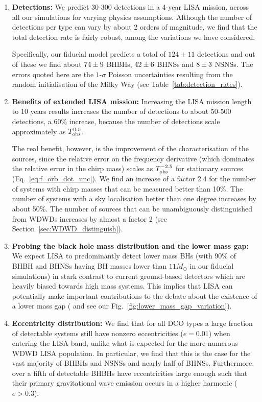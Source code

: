 \begin{enumerate}
    \item \textbf{Detections:} We predict 30-300 detections in a 4-year LISA mission, across all our simulations for varying physics assumptions. Although the number of detections per type can vary by about 2 orders of magnitude, we find that the total detection rate is fairly robust, among the variations we have considered.
    
    Specifically, our fiducial model predicts a total of $124 \pm 11$ detections and out of these we find about $74{}\pm 9$ BHBHs, $42{}\pm 6$ BHNSs and $8{}\pm 3$ NSNSs. The errors quoted here are the $1$-$\sigma$ Poisson uncertainties resulting from the random initialisation of the Milky Way (see Table~\ref{tab:detection_rates}).
    
    \item \textbf{Benefits of extended LISA mission:} Increasing the LISA mission length to 10 years results increases the number of detections to about 50-500 detections, a 60\% increase, because the number of detections scale approximately as $T_{\rm obs}^{0.5}$.
    
    The real benefit, however, is the improvement of the characterisation of the sources, since the relative error on the frequency derivative (which dominates the relative error in the chirp mass) scales as $T_{\rm obs}^{-2.5}$  for stationary sources (Eq.~\ref{eq:f_orb_dot_unc}).
%    
    We find an increase of a factor 2.4 for the number of systems with chirp masses that can be measured better than 10\%. 
%    
    The number of systems with a sky localisation better than one degree increases by about 50\%.
%    
    The number of sources that can be unambiguously distinguished from WDWDs increases by almost a factor 2 (see Section~\ref{sec:WDWD_distinguish}).
    
    \item \textbf{Probing the black hole mass distribution and the lower mass gap:} We expect LISA to predominantly detect lower mass BHs (with 90\% of BHBH and BHNSs having BH masses lower than $11 \unit{M_\odot}$ in our fiducial simulations) in stark contrast to current ground-based detectors which are heavily biased towards high mass systems. This implies that LISA can potentially make important contributions to the debate about the existence of a lower mass gap (\citealt{Shao+2021} and see our Fig.~\ref{fig:lower_mass_gap_variation}).
    
    \item \textbf{Eccentricity distribution:} We find that for all DCO types a large fraction of detectable systems still have nonzero eccentricities ($e = 0.01$) when entering the LISA band, unlike what is expected for the more numerous WDWD LISA population. In particular, we find that this is the case for the vast majority of BHBHs and NSNSs and nearly half of BHNSs. Furthermore, over a fifth of detectable BHBHs have eccentricities large enough such that their primary gravitational wave emission occurs in a higher harmonic ($e > 0.3$).
    

\end{enumerate}
